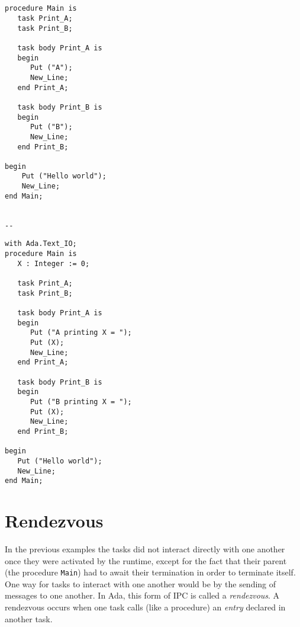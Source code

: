 \begin{minipage}{0.45\linewidth}
\lstset{language=ada}
\begin{lstlisting}[caption=Tasks in a procedure,label=tasks_in_proc]


procedure Main is
   task Print_A;
   task Print_B;

   task body Print_A is
   begin
      Put ("A");
      New_Line;
   end Print_A;

   task body Print_B is
   begin
      Put ("B");
      New_Line;
   end Print_B;

begin
	Put ("Hello world");
	New_Line;
end Main;


--
\end{lstlisting}
\end{minipage}
\hspace{5mm}
\begin{minipage}{0.45\linewidth}
\lstset{language=ada}
\begin{lstlisting}[caption=Sharing of data in tasks,label=shared_data]
with Ada.Text_IO;
procedure Main is
   X : Integer := 0;

   task Print_A;
   task Print_B;

   task body Print_A is
   begin
      Put ("A printing X = ");
      Put (X);
      New_Line;
   end Print_A;

   task body Print_B is
   begin
      Put ("B printing X = ");
      Put (X);
      New_Line;
   end Print_B;

begin
   Put ("Hello world");
   New_Line;
end Main;
\end{lstlisting}
\end{minipage}

\section{Rendezvous}
In the previous examples the tasks did not interact directly with one
another once they were activated by the runtime, except for the fact
that their parent (the procedure \texttt{Main}) had to await their
termination in order to terminate itself. One way for tasks to
interact with one another would be by the sending of messages to one
another. In Ada, this form of IPC is called a \emph{rendezvous}. A
rendezvous occurs when one task calls (like a procedure) an
\emph{entry} declared in another task.

